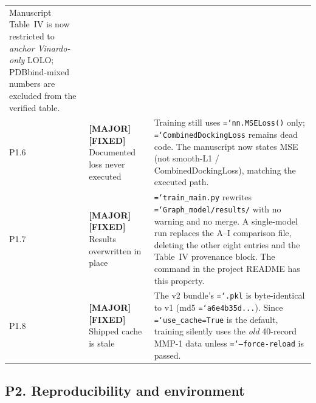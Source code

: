 \documentclass[11pt,a4paper]{article}
\newcommand{\ok}[1]{\textcolor{okgreen}{#1}}
\newcommand{\warn}[1]{\textcolor{warnamber}{#1}}
\newcommand{\code}[1]{\texttt{\small\hyphenchar\font=`\-\relax #1}}
\newcommand{\SMAJOR}{\warn{\textbf{[MAJOR]}}}
\newcommand{\SFIXED}{\ok{\textbf{[FIXED]}}}
\begin{document}
\begin{longtable}{@{}L{0.6cm}L{5.2cm}L{8.6cm}@{}}
  Manuscript Table~IV is now restricted to \emph{anchor Vinardo-only}
  LOLO; PDBbind-mixed numbers are excluded from the verified table. \\
P1.6 & \SMAJOR{} \SFIXED{} Documented loss never executed &
  Training still uses \code{nn.MSELoss()} only; \code{CombinedDockingLoss}
  remains dead code. The manuscript now states MSE (not smooth-L1 /
  CombinedDockingLoss), matching the executed path. \\
P1.7 & \SMAJOR{} \SFIXED{} Results overwritten in place &
  \code{train\_main.py} rewrites \code{Graph\_model/results/} with no warning
  and no merge. A single-model run replaces the A--I comparison file,
  deleting the other eight entries and the Table~IV provenance block. The
  command in the project README has this property. \\
P1.8 & \SMAJOR{} \SFIXED{} Shipped cache is stale &
  The v2 bundle's \code{.pkl} is byte-identical to v1
  (md5 \code{a6e4b35d...}). Since \code{use\_cache=True} is the default,
  training silently uses the \emph{old} 40-record MMP-1 data unless
  \code{--force-reload} is passed. \\
\bottomrule
\end{longtable}

\subsection{P2. Reproducibility and environment}
\end{document}
